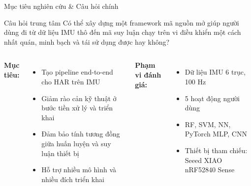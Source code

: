 \documentclass[aspectratio=169,12pt]{beamer}
\begin{document}
\begin{frame}{Mục tiêu nghiên cứu \& Câu hỏi chính}
  \begin{block}{Câu hỏi trung tâm}
    Có thể xây dựng một framework mã nguồn mở giúp người dùng đi từ dữ liệu IMU thô đến mã suy luận chạy trên vi điều khiển một cách nhất quán, minh bạch và tái sử dụng được hay không?
  \end{block}

  \vspace{6pt}
  \begin{columns}[T]
      \textbf{Mục tiêu:}
      \begin{itemize}\small
        \item Tạo pipeline end-to-end cho HAR trên IMU
        \item Giảm rào cản kỹ thuật ở bước tiền xử lý và triển khai
        \item Đảm bảo tính tương đồng giữa huấn luyện và suy luận thiết bị
        \item Hỗ trợ nhiều mô hình và nhiều đích triển khai
      \end{itemize}

      \textbf{Phạm vi đánh giá:}
      \begin{itemize}\small
        \item Dữ liệu IMU 6 trục, 100 Hz
        \item 5 hoạt động người dùng
        \item RF, SVM, NN, PyTorch MLP, CNN
        \item Thiết bị tham chiếu: Seeed XIAO nRF52840 Sense
      \end{itemize}
  \end{columns}
\end{frame}

\end{document}
